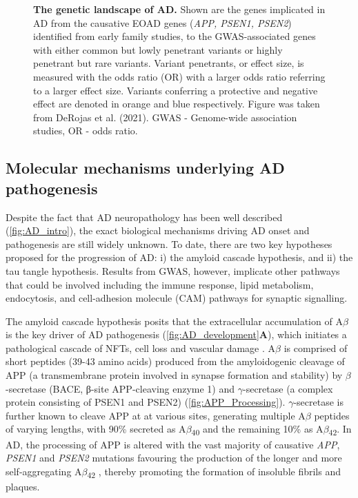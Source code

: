 \begin{landscape}
\begin{figure}[!htp]
		\caption[The genetic landscape of AD]%
		{\textbf{The genetic landscape of AD.} Shown are the genes implicated in AD from the causative EOAD genes (\textit{APP, PSEN1, PSEN2}) identified from early family studies, to the GWAS-associated genes with either common but lowly penetrant variants or highly penetrant but rare variants. Variant penetrants, or effect size, is measured with the odds ratio (OR) with a larger odds ratio referring to a larger effect size. Variants conferring a protective and negative effect are denoted in orange and blue respectively. Figure was taken from DeRojas et al. (2021)\cite{DeRojas2021}. GWAS - Genome-wide association studies, OR - odds ratio.
		}
		\label{fig:AD_gwas}
	\end{figure}
\end{landscape}

\subsection{Molecular mechanisms underlying AD pathogenesis}
\label{aetiologyAD}
Despite the fact that AD neuropathology has been well described (\cref{fig:AD_intro}), the exact biological mechanisms driving AD onset and pathogenesis are still widely unknown. To date, there are two key hypotheses proposed for the progression of AD: i) the amyloid cascade hypothesis, and ii) the tau tangle hypothesis. Results from GWAS, however, implicate other pathways that could be involved including the immune response, lipid metabolism, endocytosis, and cell-adhesion molecule (CAM) pathways for synaptic signalling.  

The amyloid cascade hypothesis posits that the extracellular accumulation of A$\beta$ is the key driver of AD pathogenesis (\cref{fig:AD_development}\textbf{A}), which initiates a pathological cascade of NFTs, cell loss and vascular damage \cite{Hardy1992}. A$\beta$ is comprised of short peptides (39-43 amino acids) \cite{J1987} produced from the amyloidogenic cleavage of APP (a transmembrane protein involved in synapse formation and stability) by $\beta$-secretase (BACE, β-site APP-cleaving enzyme 1) and $\gamma$-secretase (a complex protein consisting of PSEN1 and PSEN2) (\cref{fig:APP_Processing}).  $\gamma$-secretase is further known to cleave APP at at various sites, generating multiple A$\beta$ peptides of varying lengths, with 90\% secreted as A$\beta$\textsubscript{40} and the remaining 10\% as A$\beta$\textsubscript{42}\cite{Asami-Odaka1995}. In AD, the processing of APP is altered with the vast majority of causative \textit{APP}, \textit{PSEN1} and \textit{PSEN2} mutations favouring the production of the longer and more self-aggregating A$\beta$\textsubscript{42} \cite{Li2019,D1996,JT1993}, thereby promoting the formation of insoluble fibrils and plaques\cite{JT1993}. 

